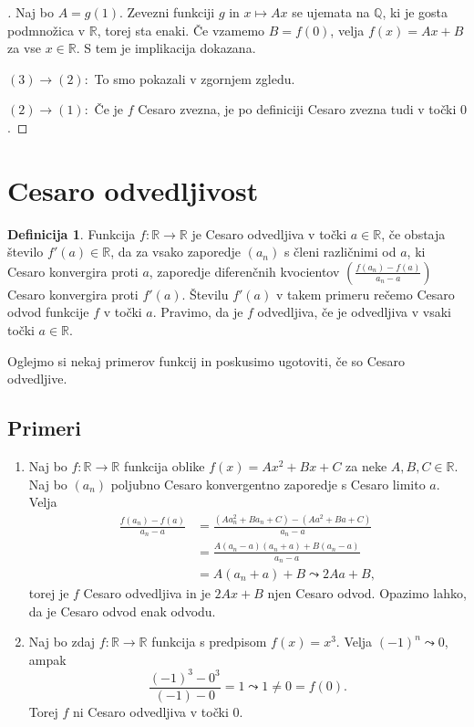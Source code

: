 \documentclass[a4paper,12pt]{article}
\theoremstyle{definition}
\newtheorem{definicija}{Definicija}
\theoremstyle{plain}
\newenvironment{dokaz}{\begin{proof}[\bfseries\upshape\proofname]}{\end{proof}}
\begin{document}
\begin{dokaz}
    Naj bo $A = g(1)$. Zevezni funkciji $g$ in $x \mapsto Ax$ se ujemata na $\mathbb{Q}$, ki je gosta podmnožica v $\mathbb{R}$, torej sta enaki. Če vzamemo $B = f(0)$, velja $f(x) = Ax + B$ za vse $x \in \mathbb{R}$. S tem je implikacija dokazana.

    $(3) \rightarrow (2): $ To smo pokazali v zgornjem zgledu.

    $(2) \rightarrow (1): $ Če je $f$ Cesaro zvezna, je po definiciji Cesaro zvezna tudi v točki $0$.
\end{dokaz}


\section{Cesaro odvedljivost}
\begin{definicija}
    Funkcija $f: \mathbb{R} \rightarrow \mathbb{R}$ je Cesaro odvedljiva v točki $a \in \mathbb{R}$, če obstaja število $f'(a) \in \mathbb{R}$, da za vsako zaporedje $(a_n)$ s členi različnimi od $a$, ki Cesaro konvergira proti $a$, zaporedje diferenčnih kvocientov $(\frac{f(a_n)-f(a)}{a_n-a})$ Cesaro konvergira proti $f'(a)$. Številu $f'(a)$ v takem primeru rečemo Cesaro odvod funkcije $f$ v točki $a$. Pravimo, da je $f$ odvedljiva, če je odvedljiva v vsaki točki $a \in \mathbb{R}$.
\end{definicija}

Oglejmo si nekaj primerov funkcij in poskusimo ugotoviti, če so Cesaro odvedljive.

\subsection*{Primeri}
\begin{enumerate}
    \item Naj bo $f: \mathbb{R} \rightarrow \mathbb{R}$ funkcija oblike $f(x) = Ax^2 + Bx + C$ za neke $A, B, C \in \mathbb{R}$. Naj bo $(a_n)$ poljubno Cesaro konvergentno zaporedje s Cesaro limito $a$. Velja 
    \begin{align*}
        \frac{f(a_n)-f(a)}{a_n-a} &= \frac{(Aa_n^2 + Ba_n + C)-(Aa^2 + Ba + C)}{a_n-a}\\
        &= \frac{A(a_n-a)(a_n+a) + B(a_n-a)}{a_n-a}\\
        &= A(a_n+a) + B \leadsto 2Aa + B,
    \end{align*}
    torej je $f$ Cesaro odvedljiva in je $2Ax + B$ njen Cesaro odvod. Opazimo lahko, da je Cesaro odvod enak odvodu.
    \item Naj bo zdaj $f: \mathbb{R} \rightarrow \mathbb{R}$ funkcija s predpisom $f(x) = x^3$. Velja $(-1)^n \leadsto 0$, ampak $$\frac{(-1)^3-0^3}{(-1)-0} = 1 \leadsto 1 \neq 0 = f(0).$$ Torej $f$ ni Cesaro odvedljiva v točki 0.
\end{enumerate}
\end{document}
